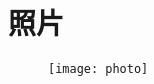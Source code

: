 \documentclass{resume}
\begin{document}
\section{\faSearch 照片}
\begin{figure}[!htbp]
	\begin{flushleft}
	\texttt{[image: photo]}
	\end{flushleft}
\end{figure}

%
%
\end{document}
